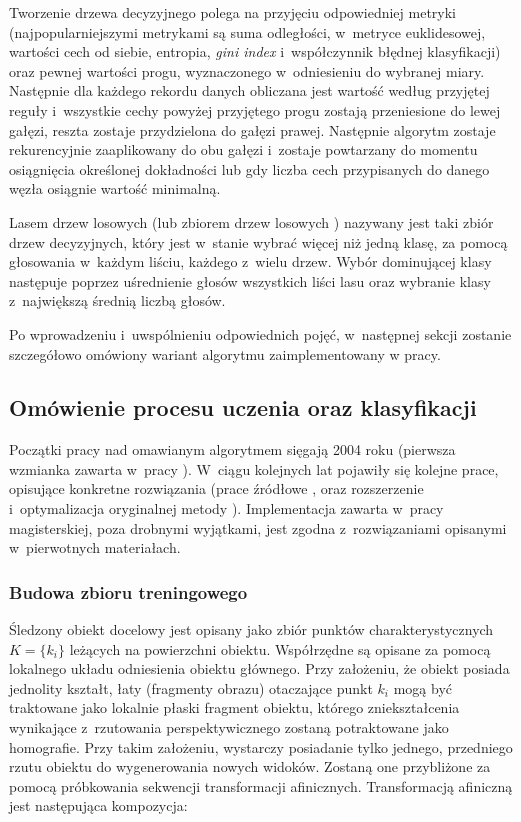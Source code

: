       Tworzenie drzewa decyzyjnego polega na przyjęciu odpowiedniej metryki (najpopularniejszymi metrykami są suma odległości, w~metryce euklidesowej, wartości cech od siebie, entropia, \textit{gini index} i~współczynnik błędnej klasyfikacji) oraz pewnej wartości progu, wyznaczonego w~odniesieniu do wybranej miary. Następnie dla każdego rekordu danych obliczana jest wartość według przyjętej reguły i~wszystkie cechy powyżej przyjętego progu zostają przeniesione do lewej gałęzi, reszta zostaje przydzielona do gałęzi prawej. Następnie algorytm zostaje rekurencyjnie zaaplikowany do obu gałęzi i~zostaje powtarzany do momentu osiągnięcia określonej dokładności lub gdy liczba cech przypisanych do danego węzła osiągnie wartość minimalną.

      Lasem drzew losowych (lub zbiorem drzew losowych \cite{RealTimeRandomizedTrees05}) nazywany jest taki zbiór drzew decyzyjnych, który jest w~stanie wybrać więcej niż jedną klasę, za pomocą głosowania w~każdym liściu, każdego z~wielu drzew. Wybór dominującej klasy następuje poprzez uśrednienie głosów wszystkich liści lasu oraz wybranie klasy z~największą średnią liczbą głosów.

      Po wprowadzeniu i~uwspólnieniu odpowiednich pojęć, w~następnej sekcji zostanie szczegółowo omówiony wariant algorytmu zaimplementowany w pracy.

    \subsection{Omówienie procesu uczenia oraz klasyfikacji}

      Początki pracy nad omawianym algorytmem sięgają 2004 roku (pierwsza wzmianka zawarta w~pracy \cite{RecognizingFeaturePointsUsingClassificationTrees04}). W~ciągu kolejnych lat pojawiły się kolejne prace, opisujące konkretne rozwiązania (prace źródłowe \cite{RealTimeRandomizedTrees05}, \cite{RandomizedTrees06} oraz rozszerzenie i~optymalizacja oryginalnej metody \cite{TwoStageRandomizedTrees11}). Implementacja zawarta w~pracy magisterskiej, poza drobnymi wyjątkami, jest zgodna z~rozwiązaniami opisanymi w~pierwotnych materiałach.

      \subsubsection{Budowa zbioru treningowego}

        Śledzony obiekt docelowy jest opisany jako zbiór punktów charakterystycznych $K = \{k_{i}\}$ leżących na powierzchni obiektu. Współrzędne są opisane za pomocą lokalnego układu odniesienia obiektu głównego. Przy założeniu, że obiekt posiada jednolity kształt, łaty (fragmenty obrazu) otaczające punkt $k_{i}$ mogą być traktowane jako lokalnie płaski fragment obiektu, którego zniekształcenia wynikające z~rzutowania perspektywicznego zostaną potraktowane jako homografie. Przy takim założeniu, wystarczy posiadanie tylko jednego, przedniego rzutu obiektu do wygenerowania nowych widoków. Zostaną one przybliżone za pomocą próbkowania sekwencji transformacji afinicznych. Transformacją afiniczną jest następująca kompozycja:

